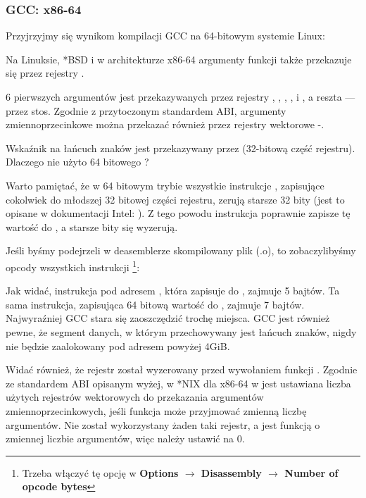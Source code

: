 \subsubsection{GCC: x86-64}

Przyjrzyjmy się wynikom kompilacji GCC na 64-bitowym systemie Linux:



Na Linuksie, *BSD i \MacOSX w architekturze x86-64 argumenty funkcji także przekazuje się przez rejestry \SysVABI.

6 pierwszych argumentów jest przekazywanych przez rejestry \RDI, \RSI, \RDX, \RCX,  i , a reszta --- przez stos.
Zgodnie z przytoczonym standardem ABI, argumenty zmiennoprzecinkowe można przekazać również przez rejestry wektorowe -.

Wskaźnik na łańcuch znaków jest przekazywany przez \EDI (32-bitową część rejestru). Dlaczego nie użyto 64 bitowego \RDI?

Warto pamiętać, że w 64 bitowym trybie wszystkie instrukcje \MOV, zapisujące cokolwiek do młodszej 32 bitowej części rejestru, zerują starsze 32 bity (jest to opisane w dokumentacji Intel: ).
Z tego powodu instrukcja  poprawnie zapisze tę wartość do \RAX, a starsze bity się wyzerują.

Jeśli byśmy podejrzeli w deasemblerze \IDA skompilowany plik (.o), to zobaczylibyśmy opcody wszystkich instrukcji
\footnote{Trzeba włączyć tę opcję w \textbf{Options $\rightarrow$ Disassembly $\rightarrow$ Number of opcode bytes}}:



\label{hw_EDI_instead_of_RDI}
Jak widać, instrukcja \MOV pod adresem , która zapisuje do \EDI, zajmuje 5 bajtów.
Ta sama instrukcja, zapisująca 64 bitową wartość do \RDI, zajmuje 7 bajtów.
Najwyraźniej GCC stara się zaoszczędzić trochę miejsca.
GCC jest również pewne, że segment danych, w którym przechowywany jest łańcuch znaków, nigdy nie będzie zaalokowany pod adresem powyżej 4\gls{GiB}.

\label{SysVABI_input_EAX}
Widać również, że rejestr \EAX został wyzerowany przed wywołaniem funkcji \printf.
Zgodnie ze standardem ABI opisanym wyżej, w *NIX dla x86-64 w \EAX jest ustawiana liczba użytych rejestrów wektorowych do przekazania argumentów zmiennoprzecinkowych, jeśli funkcja może przyjmować zmienną liczbę argumentów.
Nie został wykorzystany żaden taki rejestr, a \printf jest funkcją o zmiennej liczbie argumentów, więc należy ustawić \EAX na 0.
